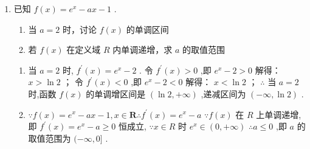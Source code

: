 \begin{enumerate}
    \item 已知 $f\left( x\right)  = {{e}}^{x} - {ax} - 1$ .
    \begin{enumerate}
        \item 当 $a = 2$ 时，讨论 $f\left( x\right)$ 的单调区间
        \item 若 $f\left( x\right)$ 在定义域 ${R}$ 内单调递增，求 $a$ 的取值范围
    \end{enumerate}
    \begin{jieda}
        \begin{enumerate}
            \item 当 $a = 2$ 时, ${f}^{\prime }\left( x\right)  = {e}^{x} - 2$ .
            令 ${f}^{\prime }\left( x\right)  > 0$ ,即 ${e}^{x} - 2 > 0$ 解得： $x > \ln 2$ ；
            令 ${f}^{\prime }\left( x\right)  < 0$ ,即 ${e}^{x} - 2 < 0$ 解得： $x < \ln 2$ ；
            $\therefore$ 当 $a = 2$ 时,函数 $f\left( x\right)$ 的单调增区间是 $\left( {\ln 2, + \infty }\right)$ ,递减区间为 $\left( {-\infty ,\ln 2}\right)$ .
            \item $\because f\left( x\right)  = {e}^{x} - {ax} - 1,x \in  \mathbf{R}\therefore {f}^{\prime }\left( x\right)  = {e}^{x} - a$
            $\because f\left( x\right)$ 在 ${R}$ 上单调递增,即 ${f}^{\prime }\left( x\right)  = {e}^{x} - a \geq  0$ 恒成立,
            $\because x \in  {R}$ 时 ${e}^{x} \in  \left( {0, + \infty }\right)$
            $\therefore a \leq  0$ ,即 $a$ 的取值范围为 $( - \infty ,0\rbrack$ .
        \end{enumerate}
    \end{jieda}
    

\end{enumerate}
